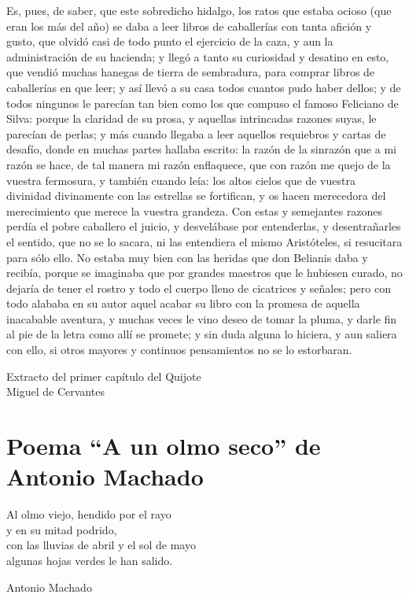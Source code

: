 \documentclass[a4paper, 12pt, twoside]{article} %
\begin{document}
Es, pues, de saber, que este sobredicho hidalgo, los ratos que estaba ocioso (que eran los más del año) se daba a leer libros de caballerías con tanta afición y gusto, que olvidó casi de todo punto el ejercicio de la caza, y aun la administración de su hacienda; y llegó a tanto su curiosidad y desatino en esto, que vendió muchas hanegas de tierra de sembradura, para comprar libros de caballerías en que leer; y así llevó a su casa todos cuantos pudo haber dellos; y de todos ningunos le parecían tan bien como los que compuso el famoso Feliciano de Silva: porque la claridad de su prosa, y aquellas intrincadas razones suyas, le parecían de perlas; y más cuando llegaba a leer aquellos requiebros y cartas de desafío, donde en muchas partes hallaba escrito: la razón de la sinrazón que a mi razón se hace, de tal manera mi razón enflaquece, que con razón me quejo de la vuestra fermosura, y también cuando leía: los altos cielos que de vuestra divinidad divinamente con las estrellas se fortifican, y os hacen merecedora del merecimiento que merece la vuestra grandeza. Con estas y semejantes razones perdía el pobre caballero el juicio, y desvelábase por entenderlas, y desentrañarles el sentido, que no se lo sacara, ni las entendiera el mismo Aristóteles, si resucitara para sólo ello. No estaba muy bien con las heridas que don Belianis daba y recibía, porque se imaginaba que por grandes maestros que le hubiesen curado, no dejaría de tener el rostro y todo el cuerpo lleno de cicatrices y señales; pero con todo alababa en su autor aquel acabar su libro con la promesa de aquella inacabable aventura, y muchas veces le vino deseo de tomar la pluma, y darle fin al pie de la letra como allí se promete; y sin duda alguna lo hiciera, y aun saliera con ello, si otros mayores y continuos pensamientos no se lo estorbaran.

Extracto del primer capítulo del Quijote\\
Miguel de Cervantes 


\section{Poema ``A un olmo seco'' de Antonio Machado}

\noindent Al olmo viejo, hendido por el rayo \\ %
y en su mitad podrido,\\
con las lluvias de abril y el sol de mayo\\
algunas hojas verdes le han salido.

Antonio Machado
\end{document}
